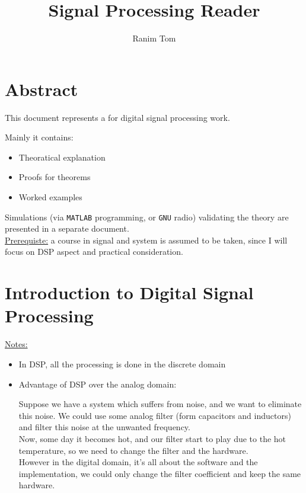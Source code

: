 \documentclass[12pt,a4paper]{book}
\title{Signal Processing Reader}
\author{Ranim Tom}
\begin{document}
\maketitle

\chapter*{Abstract}

This document represents a  for digital signal processing work. 

Mainly it contains:

\begin{itemize}

\item Theoratical explanation

\item Proofs for theorems

\item Worked examples

\end{itemize}


Simulations (via \verb|MATLAB| programming, or \verb|GNU| radio) validating the theory are presented in a separate document.\\

\underline{Prerequiste:} a course in signal and system is assumed to be taken, since I will focus on DSP aspect and practical consideration.


\tableofcontents


\pagestyle{fancy}
\fancyhf{} %
\rhead{\rightmark}

\chapter{Introduction to Digital Signal Processing}

\underline{Notes:}\\

\begin{itemize}

\item In DSP, all the processing is done in the discrete domain

\item Advantage of DSP over the analog domain:

Suppose we have a system which suffers from noise, and we want to eliminate this noise. We could use some analog filter (form capacitors and inductors) and filter this noise at the unwanted frequency.\\

Now, some day it becomes hot, and our filter start to play due to the hot temperature, so we need to change the filter and the hardware.\\

However in the digital domain, it's all about the software and the implementation, we could only change the filter coefficient and keep the same hardware.

\end{itemize}
\end{document}
